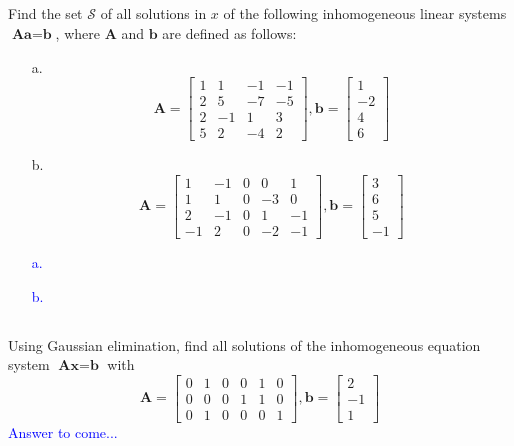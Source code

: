 \documentclass[a4paper,12pt]{article}
\newcommand{\M}[1]{ \begin{bmatrix} #1 \end{bmatrix} }
\newcommand{\vecx}{\textbf{x}}
\newcommand{\veca}{\textbf{a}}
\newcommand{\vecb}{\textbf{b}}
\newcommand{\matA}{\textbf{A}}
\begin{document}
\subsection{}
Find the set $\mathcal{S}$ of all solutions in $x$ of the following inhomogeneous linear systems $\matA \veca = \vecb$, where $\matA$ and $\vecb$ are defined as follows:
\begin{itemize}
 \item [a.] $$\matA = \M{1&1&-1&-1\\2&5&-7&-5\\2&-1&1&3\\5&2&-4&2}, \vecb = \M{1\\-2\\4\\6}$$
 \item [b.] $$\matA = \M{1&-1&0&0&1\\1&1&0&-3&0\\2&-1&0&1&-1\\-1&2&0&-2&-1}, \vecb = \M{3\\6\\5\\-1}$$
\end{itemize}
\textcolor{blue}{
\begin{itemize}
 \item [a.]
 \item [b.]
\end{itemize}
}
\subsection{}
Using Gaussian elimination, find all solutions of the inhomogeneous equation system $\matA \vecx=\vecb$ with
$$\matA = \M{0&1&0&0&1&0\\0&0&0&1&1&0\\0&1&0&0&0&1}, \vecb = \M{2\\-1\\1}$$
\textcolor{blue}{
Answer to come...
}
\end{document}
